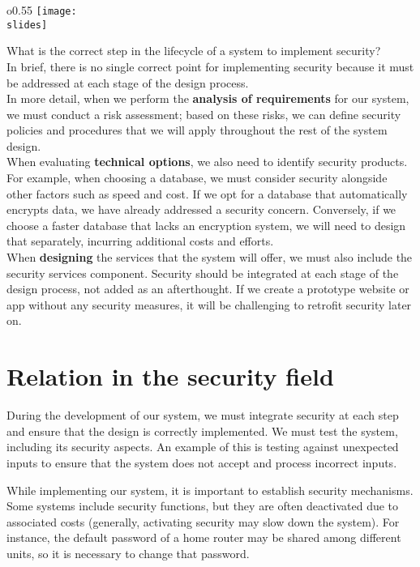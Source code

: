 \begin{wrapfigure}{o}{0.55\textwidth}
  \centering
  \texttt{[image: \\slides]}
\end{wrapfigure}
What is the correct step in the lifecycle of a system to implement security?\\
In brief, there is no single correct point for implementing security because it must be addressed at each stage of the design process.\\
In more detail, when we perform the \textbf{analysis of requirements} for our system, we must conduct a risk assessment; based on these risks, we can define security policies and procedures that we will apply throughout the rest of the system design.\\
When evaluating \textbf{technical options}, we also need to identify security products. For example, when choosing a database, we must consider security alongside other factors such as speed and cost. If we opt for a database that automatically encrypts data, we have already addressed a security concern. Conversely, if we choose a faster database that lacks an encryption system, we will need to design that separately, incurring additional costs and efforts. \\
When \textbf{designing} the services that the system will offer, we must also include the security services component. Security should be integrated at each stage of the design process, not added as an afterthought. If we create a prototype website or app without any security measures, it will be challenging to retrofit security later on.


\section{Relation in the security field}
During the development of our system, we must integrate security at each step and ensure that the design is correctly implemented. We must test the system, including its security aspects. An example of this is testing against unexpected inputs to ensure that the system does not accept and process incorrect inputs.

While implementing our system, it is important to establish security mechanisms. Some systems include security functions, but they are often deactivated due to associated costs (generally, activating security may slow down the system). For instance, the default password of a home router may be shared among different units, so it is necessary to change that password.

